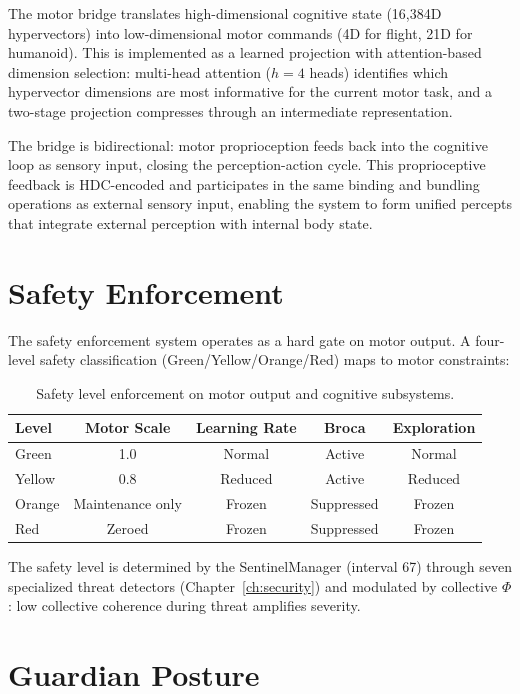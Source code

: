 \documentclass[12pt]{book}
\begin{document}
The motor bridge translates high-dimensional cognitive state (16,384D hypervectors) into low-dimensional motor commands (4D for flight, 21D for humanoid). This is implemented as a learned projection with attention-based dimension selection: multi-head attention ($h = 4$ heads) identifies which hypervector dimensions are most informative for the current motor task, and a two-stage projection compresses through an intermediate representation.

The bridge is bidirectional: motor proprioception feeds back into the cognitive loop as sensory input, closing the perception-action cycle. This proprioceptive feedback is HDC-encoded and participates in the same binding and bundling operations as external sensory input, enabling the system to form unified percepts that integrate external perception with internal body state.

\section{Safety Enforcement}

The safety enforcement system operates as a hard gate on motor output. A four-level safety classification (Green/Yellow/Orange/Red) maps to motor constraints:

\begin{table}[H]
\centering
\caption{Safety level enforcement on motor output and cognitive subsystems.}
\label{tab:safety-levels}
\begin{tabular}{lcccc}
\toprule
\textbf{Level} & \textbf{Motor Scale} & \textbf{Learning Rate} & \textbf{Broca} & \textbf{Exploration} \\
\midrule
Green & 1.0 & Normal & Active & Normal \\
Yellow & 0.8 & Reduced & Active & Reduced \\
Orange & Maintenance only & Frozen & Suppressed & Frozen \\
Red & Zeroed & Frozen & Suppressed & Frozen \\
\bottomrule
\end{tabular}
\end{table}

The safety level is determined by the SentinelManager (interval 67) through seven specialized threat detectors (Chapter~\ref{ch:security}) and modulated by collective $\Phi$: low collective coherence during threat amplifies severity.

\section{Guardian Posture}
\end{document}
